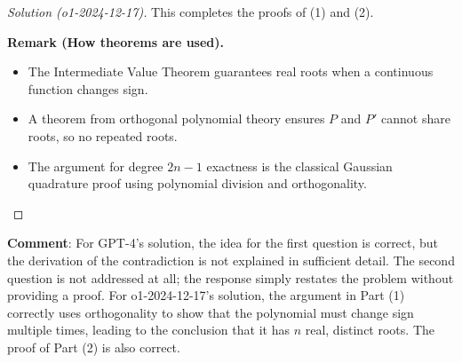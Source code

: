 \documentclass[11pt]{article}
\numberwithin{equation}{section}
\begin{document}
\begin{proof}[Solution (o1-2024-12-17)]
This completes the proofs of (1) and (2).

\textbf{Remark (How theorems are used).}
\begin{itemize}
\item The Intermediate Value Theorem guarantees real roots when a continuous function changes sign.
\item A theorem from orthogonal polynomial theory ensures $P$ and $P'$ cannot share roots, so no repeated roots.
\item The argument for degree $2n-1$ exactness is the classical Gaussian quadrature proof using polynomial division and orthogonality.
\end{itemize}

\end{proof}

\textbf{Comment}: For GPT-4’s solution, the idea for the first question is correct, but the derivation of the contradiction is not explained in sufficient detail. The second question is not addressed at all; the response simply restates the problem without providing a proof. For o1-2024-12-17’s solution, the argument in Part (1) correctly uses orthogonality to show that the polynomial must change sign multiple times, leading to the conclusion that it has $n$ real, distinct roots. The proof of Part (2) is also correct.
\end{document}
